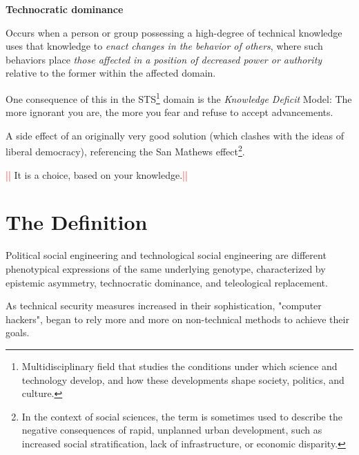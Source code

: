     \begin{center}
        \textbf{Technocratic dominance}
        \end{center}
    
        Occurs when a person or group possessing a high-degree of technical knowledge uses that knowledge to \textit{enact changes in the behavior of others}, where such behaviors place \textit{those affected in a position of decreased power or authority} relative to the former within the affected domain.
        
        \vspace{0.1cm}
    
        One consequence of this in the STS\footnote{Multidisciplinary field that studies the conditions under which science and technology develop, and how these developments shape society, politics, and culture.} domain is the \textit{Knowledge Deficit} Model: The more ignorant you are, the more you fear and refuse to accept advancements.
            
        \vspace{0.1cm}
    
        A side effect of an originally very good solution (which clashes with the ideas of liberal democracy), referencing the San Mathews effect\footnote{In the context of social sciences, the term is sometimes used to describe the negative consequences of rapid, unplanned urban development, such as increased social stratification, lack of infrastructure, or economic disparity.}.

        \vspace{0.1cm}
    
        \textcolor{Red}{||} It is a choice, based on your knowledge.\textcolor{Red}{||}
    
\section{The Definition}
Political social engineering and technological social engineering are different phenotypical expressions of the same underlying genotype, characterized by epistemic asymmetry, technocratic dominance, and teleological replacement.

As technical security measures increased in their sophistication, "computer hackers", began to rely more and more on non-technical methods to achieve their goals. 

